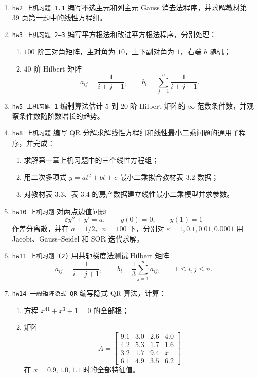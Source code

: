 \documentclass{article}
\begin{document}
\begin{enumerate}
  \item \texttt{hw2 上机习题 1.1} 编写不选主元和列主元 Gauss 消去法程序，并求解教材第 39 页第一题中的线性方程组。

  \item \texttt{hw3 上机习题 2--3} 编写平方根法和改进平方根法程序，分别处理：
  \begin{enumerate}[(1)]
    \item $100$ 阶三对角矩阵，主对角为 $10$，上下副对角为 $1$，右端 $b$ 随机；
    \item $40$ 阶 Hilbert 矩阵
    \[
      a_{ij}=\frac{1}{i+j-1},\qquad
      b_i=\sum_{j=1}^n\frac{1}{i+j-1}.
    \]
  \end{enumerate}

  \item \texttt{hw5 上机习题 1} 编制算法估计 $5$ 到 $20$ 阶 Hilbert 矩阵的
  $\infty$ 范数条件数，并观察条件数随阶数增长的趋势。

  \item \texttt{hw8 上机习题} 编写 QR 分解求解线性方程组和线性最小二乘问题的通用子程序，并完成：
  \begin{enumerate}[(1)]
    \item 求解第一章上机习题中的三个线性方程组；
    \item 用二次多项式 $y=at^2+bt+c$ 最小二乘拟合教材表 3.2 数据；
    \item 对教材表 3.3、表 3.4 的房产数据建立线性最小二乘模型并求参数。
  \end{enumerate}

  \item \texttt{hw10 上机习题} 对两点边值问题
  \[
    \varepsilon y''+y'=a,\qquad y(0)=0,\qquad y(1)=1
  \]
  作差分离散，并在 $a=1/2$、$n=100$ 下，分别对
  $\varepsilon=1,0.1,0.01,0.0001$ 用 Jacobi、Gauss--Seidel 和 SOR 迭代求解。

  \item \texttt{hw11 上机习题 (2)} 用共轭梯度法测试 Hilbert 矩阵
  \[
    a_{ij}=\frac{1}{i+j+1},\qquad
    b_i=\frac13\sum_{j=1}^n a_{ij},\qquad 1\le i,j\le n.
  \]

  \item \texttt{hw14 一般矩阵隐式 QR} 编写隐式 QR 算法，计算：
  \begin{enumerate}[(1)]
    \item 方程 $x^{41}+x^3+1=0$ 的全部根；
    \item 矩阵
    \[
      A=
      \begin{bmatrix}
        9.1&3.0&2.6&4.0\\
        4.2&5.3&1.7&1.6\\
        3.2&1.7&9.4&x\\
        6.1&4.9&3.5&6.2
      \end{bmatrix}
    \]
    在 $x=0.9,1.0,1.1$ 时的全部特征值。
  \end{enumerate}


\end{enumerate}
\end{document}
